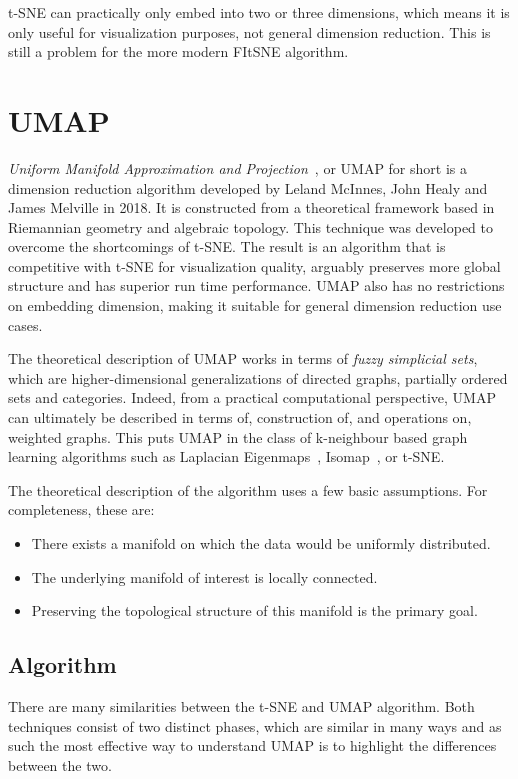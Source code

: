t-SNE can practically only embed into two or three dimensions, which means it is only useful for visualization purposes, not general dimension reduction. This is still a problem for the more modern FItSNE algorithm.

\section{UMAP}\label{sec:umap}

\textit{Uniform Manifold Approximation and Projection}~\cite{bib:umap}, or UMAP for short is a dimension reduction algorithm developed by Leland McInnes, John Healy and James Melville in 2018. It is constructed from a theoretical framework based in Riemannian geometry and algebraic topology. This technique was developed to overcome the shortcomings of t-SNE. The result is an algorithm that is competitive with t-SNE for visualization quality, arguably preserves more global structure and has superior run time performance. UMAP also has no restrictions on embedding dimension, making it suitable for general dimension reduction use cases.

The theoretical description of UMAP works in terms of \textit{fuzzy simplicial sets}, which are higher-dimensional generalizations of directed graphs, partially ordered sets and categories. Indeed, from a practical computational perspective, UMAP can ultimately be described in terms of, construction of, and operations on, weighted graphs. This puts UMAP in the class of k-neighbour based graph learning algorithms such as Laplacian Eigenmaps~\cite{bib:laplacian_eigenmaps}, Isomap~\cite{bib:isomap}, or t-SNE.

The theoretical description of the algorithm uses a few basic assumptions. For completeness, these are:

\begin{itemize}
	\item There exists a manifold on which the data would be uniformly distributed.
	\item The underlying manifold of interest is locally connected.
	\item Preserving the topological structure of this manifold is the primary goal.
\end{itemize}

\subsection{Algorithm}

There are many similarities between the t-SNE and UMAP algorithm. Both techniques consist of two distinct phases, which are similar in many ways and as such the most effective way to understand UMAP is to highlight the differences between the two.

